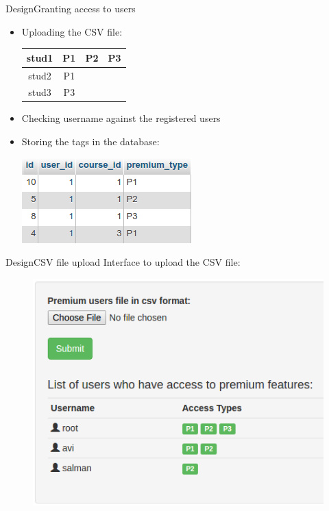 \documentclass[xcolor=table]{beamer}
\begin{document}
\begin{frame}{Design}{Granting access to users}
	\begin{itemize}
		\item Uploading the CSV file:
		\begin{center}
		\begin{tabular}{|c|c|c|c|}
			\hline stud1 & P1 & P2 & P3 \\ 
			\hline stud2 & P1 &  &  \\ 
			\hline stud3 & P3 &  &  \\ 
			\hline 
		\end{tabular}
		\end{center} 
		\item Checking username against the registered users
		\item Storing the tags in the database: 
		\begin{center}
			\includegraphics[width=0.5\linewidth]{media/premiumAccesses}
		\end{center}
	\end{itemize}
\end{frame}

\begin{frame}{Design}{CSV file upload}
	Interface to upload the CSV file:
	\begin{figure}
	\centering
	\includegraphics[width=0.6\linewidth]{media/CSVupload}
	\label{fig:CSVupload}
	\end{figure}
\end{frame}
\end{document}

